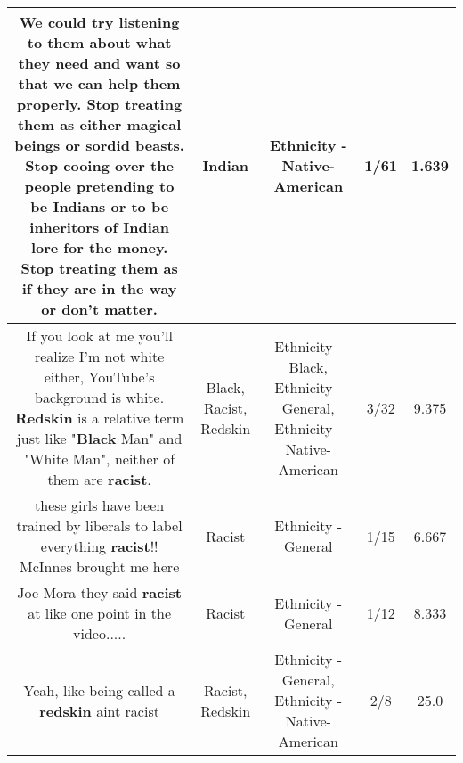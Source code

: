 \documentclass[11pt]{article}
\newlength\mylength
\begin{document}
\begin{center}
\begin{longtable}{|C{.65\mylength}|C{.30\mylength}|C{.12\mylength}|C{.12\mylength}|C{.12\mylength}|}
  \small We could try listening to them about what they need and want so that we can help them properly. Stop treating them as either magical beings or sordid beasts. Stop cooing over the people pretending to be Indians or to be inheritors of \textbf{Indian} lore for the money. Stop treating them as if they are in the way or don't matter.\normalsize   & Indian & Ethnicity - Native-American & 1/61 & 1.639 \\  \hline
  \small If you look at me you'll realize I'm not white either, YouTube's background is white. \textbf{Redskin} is a relative term just like "\textbf{Black} Man" and "White Man", neither of them are \textbf{racist}.\normalsize   & Black, Racist, Redskin & Ethnicity - Black, Ethnicity - General, Ethnicity - Native-American & 3/32 & 9.375 \\  \hline
  \small these girls have been trained by liberals to label everything \textbf{racist}!! McInnes brought me here\normalsize   & Racist & Ethnicity - General & 1/15 & 6.667 \\  \hline
  \small Joe Mora they said \textbf{racist} at like one point in the video.....\normalsize   & Racist & Ethnicity - General & 1/12 & 8.333 \\  \hline
  \small Yeah, like being called a \textbf{redskin} aint racist\normalsize   & Racist, Redskin & Ethnicity - General, Ethnicity - Native-American & 2/8 & 25.0 \\  \hline

\end{longtable}
\end{center}
\end{document}
